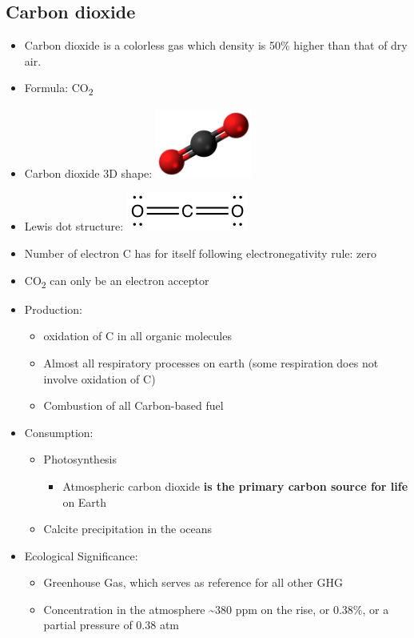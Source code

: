 \documentclass[]{book}
\providecommand{\tightlist}{%
  \setlength{\itemsep}{0pt}\setlength{\parskip}{0pt}}
\theoremstyle{definition}
\theoremstyle{definition}
\theoremstyle{definition}
\theoremstyle{remark}
\begin{document}
\subsection{Carbon dioxide}\label{carbon-dioxide}

\begin{itemize}
\item
  Carbon dioxide is a colorless gas which density is 50\% higher than
  that of dry air.
\item
  Formula: CO\textsubscript{2}
\item
  Carbon dioxide 3D shape:
  \includegraphics[width=0.25000\textwidth]{pictures/Carbon_dioxide_3D_ball.png}
\item
  Lewis dot structure:
  \includegraphics{pictures/CO2_lewis_structure.png}
\item
  Number of electron C has for itself following electronegativity rule:
  zero
\item
  CO\textsubscript{2} can only be an electron acceptor
\item
  Production:

  \begin{itemize}
  \tightlist
  \item
    oxidation of C in all organic molecules
  \item
    Almost all respiratory processes on earth (some respiration does not
    involve oxidation of C)
  \item
    Combustion of all Carbon-based fuel
  \end{itemize}
\item
  Consumption:

  \begin{itemize}
  \tightlist
  \item
    Photosynthesis

    \begin{itemize}
    \tightlist
    \item
      Atmospheric carbon dioxide \textbf{is the primary carbon source
      for life} on Earth
    \end{itemize}
  \item
    Calcite precipitation in the oceans
  \end{itemize}
\item
  Ecological Significance:

  \begin{itemize}
  \tightlist
  \item
    Greenhouse Gas, which serves as reference for all other GHG
  \item
    Concentration in the atmosphere \textasciitilde{}380 ppm on the
    rise, or 0.38\%, or a partial pressure of 0.38 atm
  \end{itemize}
\end{itemize}
\end{document}
